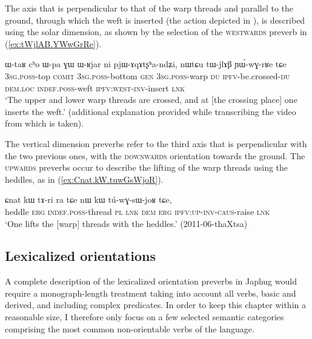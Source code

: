 The axis that is perpendicular to that of the warp threads and parallel to the ground, through which the weft is inserted (the action depicted in ), is described using the solar dimension, as shown by the selection of the \textsc{westwards} preverb in (\ref{ex:tWjlAB.YWwGrRe}).

\begin{exe}
\ex \label{ex:tWjlAB.YWwGrRe}
\gll ɯ-taʁ cʰo ɯ-pa ɣɯ ɯ-ʁjar ni pjɯ-ɤqɤtʂʰa-ndʑi, nɯtɕu tɯ-jlɤβ ɲɯ́-wɣ-rʁe tɕe   \\
\textsc{3sg}.\textsc{poss}-top \textsc{comit} \textsc{3sg}.\textsc{poss}-bottom \textsc{gen} \textsc{3sg}.\textsc{poss}-warp \textsc{du} \textsc{ipfv}-be.crossed-\textsc{du} \textsc{dem}.\textsc{loc} \textsc{indef}.\textsc{poss}-weft \textsc{ipfv}:\textsc{west}-\textsc{inv}-insert \textsc{lnk} \\
\glt `The upper and lower warp threads are crossed, and at [the crossing place] one inserts the weft.' (additional explanation provided while transcribing the video from which  is taken).%
\end{exe} 

The vertical dimension preverbs refer to the third axis that is perpendicular with the two previous ones, with the \textsc{downwards} orientation towards the ground. The \textsc{upwards} preverbs occur to describe the lifting of the warp threads using the heddles, as in (\ref{ex:Cnat.kW.tuwGsWjoR}).

\begin{exe}
\ex \label{ex:Cnat.kW.tuwGsWjoR}
\gll ɕnat kɯ tɤ-ri ra tɕe nɯ kɯ tú-wɣ-sɯ-joʁ tɕe,\\
heddle \textsc{erg} \textsc{indef}.\textsc{poss}-thread \textsc{pl} \textsc{lnk} \textsc{dem} \textsc{erg} \textsc{ipfv}:\textsc{up}-\textsc{inv}-\textsc{caus}-raise \textsc{lnk} \\
\glt `One lifts the [warp] threads with the heddles.' (2011-06-thaXtsa)
\end{exe}  

\subsection{Lexicalized orientations} \label{sec:lexicalized.orientation}
A complete description of the lexicalized orientation preverbs in Japhug would require a monograph-length treatment taking into account all verbs, basic and derived, and including complex predicates. In order to keep this chapter within a reasonable size, I therefore only focus on a few selected semantic categories comprising the most common non-orientable verbs of the language.

